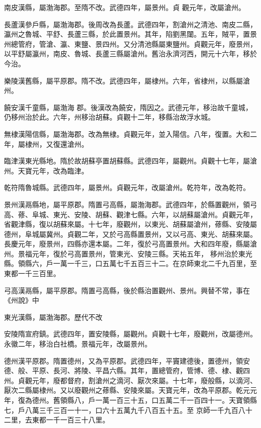 \begin{pinyinscope}
 南皮漢縣，屬渤海郡。至隋不改。武德四年，屬景州。貞
 觀元年，改屬滄州。



 長蘆漢參戶縣，屬渤海郡。後周改為長蘆。武德四年，割滄州之清池、南皮二縣，瀛州之魯城、平舒、長蘆三縣，於此置景州。其年，陷劉黑闥。五年，賊平，置景州總管府，管滄、瀛、東鹽、景四州。又分清池縣屬東鹽州。貞觀元年，廢景州，以平舒屬瀛州，南皮、魯城、長蘆三縣屬滄州。舊治永濟河西，開元十六年，移於今治。



 樂陵漢舊縣，屬平原郡。隋不改。武德四年，屬棣州。六年，省棣州，以縣屬滄州。



 饒安漢千童縣，屬渤海
 郡。後漢改為饒安，隋因之。武德元年，移治故千童城，仍移州治於此。六年，州移治胡蘇。貞觀十二年，移縣治故浮水城。



 無棣漢陽信縣，屬渤海郡。改為無棣。貞觀元年，並入陽信。八年，復置。大和二年，屬棣州，又復還滄州。



 臨津漢東光縣地。隋於故胡蘇亭置胡蘇縣。武德四年，屬觀州。貞觀十七年，屬滄州。天寶元年，改為臨津。



 乾符隋魯城縣。武德四年，屬景州。貞觀元年，改屬滄州。乾符年，改為乾符。



 景州漢鬲縣地，屬平原郡。隋置弓高縣，屬渤海郡。武德四年，於縣置觀州，領弓高、蓚、阜城、東光、安陵、胡蘇、觀津七縣。六年，以胡蘇屬滄州。貞觀元年，省觀津縣，復以胡蘇來屬。十七年，廢觀州，以東光、胡蘇屬滄州，蓚縣、安陵屬德州，阜城屬冀州。貞觀二年，又於弓高縣置景州，又以弓高、東光、胡蘇來屬。長慶元年，廢景州，四縣亦還本屬。二年，復於弓高置景州。大和四年廢，縣屬滄州。景福元年，復於弓高置景州，管東光、安陵三縣。天祐五年，
 移州治於東光縣。領縣六，戶一萬一千三，口五萬七千五百三十二。在京師東北二千九百里，至東都一千三百里。



 弓高漢鬲縣，屬平原郡。隋置弓高縣，後於縣治置觀州、景州。興替不常，事在《州說》中



 東光漢縣，屬渤海郡。歷代不改



 安陵隋宣府鎮。武德四年，置安陵縣，屬觀州。貞觀十七年，廢觀州，改屬德州。永徽二年，移治白社橋。景福元年，改屬景州。



 德州漢平原郡。隋置德州，又為平原郡。武德四年，平竇建德後，置德州，領安德、般、平原、長河、將陵、平昌六縣。其年，置總管府，管博、德、棣、觀四州。貞觀元年，廢都督府，割滄州之滴河、厭次來屬。十七年，廢般縣，以滴河、厭次二縣屬棣州。又以廢觀州之蓚縣、安陵來屬。天寶元年，改為平原郡。乾元元年，復為德州。舊領縣八，戶一萬一百三十五，口五萬二千一百四十一。天寶領縣七，戶八萬三千三百一十一，口六十五萬九千八百五十五。至
 京師一千九百八十二里，去東都一千一百三十八里。




\end{pinyinscope}
